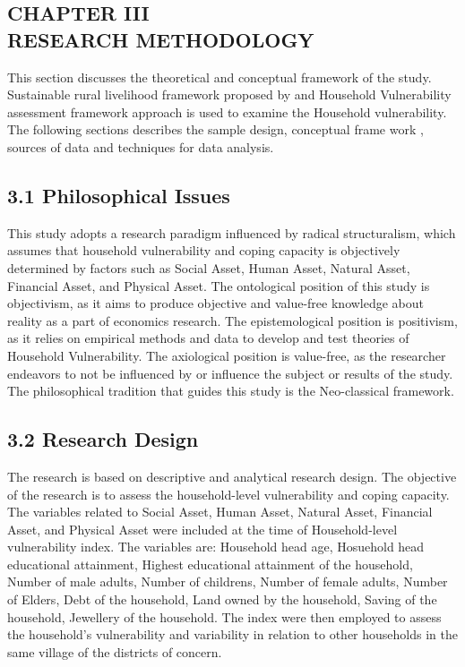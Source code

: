 \documentclass[12pt, a4paper]{article}
\begin{document}
\clearpage
\begin{center}
\section*{\large{CHAPTER III \\ \vspace{-0.3cm} RESEARCH METHODOLOGY}}
\end{center}
\renewcommand{\thepage}{\arabic{page}}
This section discusses the theoretical and conceptual framework of the study. Sustainable rural livelihood framework proposed by  \citet{dfid1999sustainable} and Household Vulnerability assessment framework approach is used to examine the Household vulnerability. The following sections describes the sample design, conceptual frame work , sources of data and techniques for data analysis. \\

\subsection*{3.1  Philosophical Issues}
\renewcommand{\thepage}{\arabic{page}}
This study adopts a research paradigm influenced by radical structuralism, which assumes that household vulnerability and coping capacity is objectively determined by factors such as Social Asset, Human Asset, Natural Asset, Financial Asset, and Physical Asset. The ontological position of this study is objectivism, as it aims to produce objective and value-free knowledge about reality as a part of economics research. The epistemological position is positivism, as it relies on empirical methods and data to develop and test theories of Household Vulnerability. The axiological position is value-free, as the researcher endeavors to not be influenced by or influence the subject or results of the study. The philosophical tradition that guides this study is the Neo-classical framework.\par

\subsection*{3.2 Research Design}
\renewcommand{\thepage}{\arabic{page}}
The research is based on descriptive and analytical research design. The objective of the research is to assess the household-level vulnerability and coping capacity. The variables related to Social Asset, Human Asset, Natural Asset, Financial Asset, and Physical Asset were included at the time of Household-level vulnerability index. The variables are: Household head age, Hosuehold head educational attainment, Highest educational attainment of the household, Number of male adults, Number of childrens, Number of female adults, Number of Elders, Debt of the household, Land owned by the household, Saving of the household, Jewellery of the household. The index were then employed to assess the household's vulnerability and variability in relation to other households in the same village of the districts of concern.   
\end{document}
